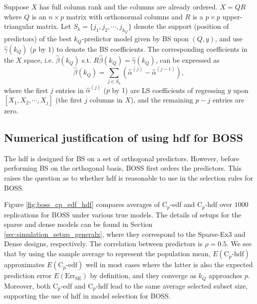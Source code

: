 \begin{theorem} 
	Suppose $X$ has full column rank and the columns are already ordered. $X=QR$ where $Q$ is an $n \times p$ matrix with orthonormal columns and $R$ is a $p \times p$ upper-triangular matrix. Let $S_k=\{j_1,j_2,\cdots,j_{k_Q}\}$ denote the support (position of predictors) of the best $k_Q$-predictor model given by BS upon $(Q,y)$, and use $\hat{\gamma}(k_Q)$ ($p$ by $1$) to denote the BS coefficients. The corresponding coefficients in the $X$ space, i.e. $\hat{\beta}(k_Q)$ s.t. $R\hat{\beta}(k_Q)=\hat{\gamma}(k_Q)$, can be expressed as
	\begin{equation*}
	\hat{\beta}(k_Q) = \sum_{j\in S_k} \left(\hat{\alpha}^{(j)} - \hat{\alpha}^{(j-1)}\right),
	\end{equation*}
	where the first $j$ entries in $\hat{\alpha}^{(j)}$ ($p$ by $1$) are LS coefficients of regressing $y$ upon $[X_1,X_2,\cdots,X_j]$ (the first $j$ columns in $X$), and the remaining $p-j$ entries are zero.

	\label{thm:correspondence}
\end{theorem}

\subsection{Numerical justification of using hdf for BOSS}
The hdf is designed for BS on a set of orthogonal predictors. However, before performing BS on the orthogonal basis, BOSS first orders the predictors. This raises the question as to whether hdf is reasonable to use in the selection rules for BOSS. 

Figure \ref{fig:boss_cp_edf_hdf} compares averages of C$_p$-edf and C$_p$-hdf over $1000$ replications for BOSS under various true models. The details of setups for the sparse and dense models can be found in Section \ref{sec:simulation_setup_generalx}, where they correspond to the Sparse-Ex3 and Dense designs, respectively. The correlation between predictors is $\rho=0.5$. We see that by using the sample average to represent the population mean, $E(\text{C}_p\text{-hdf})$ approximates $E(\text{C}_p\text{-edf})$ well in most cases where the latter is also the expected prediction error $E(\text{Err}_\text{SE})$ by definition, and they converge as $k_Q$ approaches $p$. Moreover, both C$_p$-edf and C$_p$-hdf lead to the same average selected subset size, supporting the use of hdf in model selection for BOSS. 


